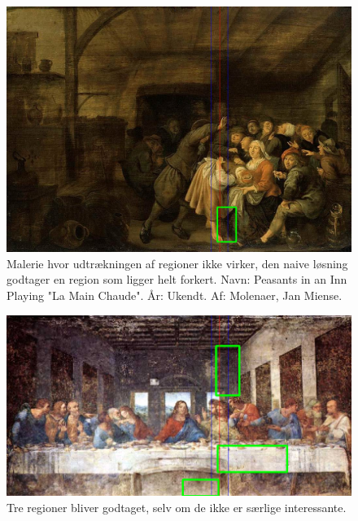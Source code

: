 \begin{figure}[h!!]
	\begin{center}
		\includegraphics[scale=0.3,angle=0]{afsnit/afprovning/billeder/naive_losning/naiv_virker_ikke1.png}
	\end{center}
	\caption[]{Malerie hvor udtrækningen af regioner ikke virker, den naive
	løsning godtager en region som ligger helt forkert. Navn:
	Peasants in an Inn Playing "La Main Chaude". År: Ukendt. Af:
	Molenaer, Jan Miense.}
	\label{naiv_virker_ikke1}
\end{figure}

\begin{figure}[h!!]
	\begin{center}
		\includegraphics[scale=0.3,angle=0]{afsnit/afprovning/billeder/naive_losning/naiv_virker_ikke2.png}
	\end{center}
	\caption[]{Tre regioner bliver godtaget, selv om de ikke er særlige
	interessante.}
	\label{naiv_virker_ikke2}
\end{figure}

